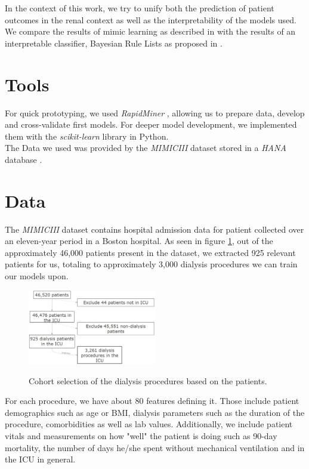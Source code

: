 \documentclass[conference,compsoc]{IEEEtran}
\begin{document}
In the context of this work, we try to unify both the prediction of patient outcomes in the renal context as well as the interpretability of the models used.
We compare the results of mimic learning as described in \cite{Che2016} with the results of an interpretable classifier, Bayesian Rule Lists as proposed in \cite{Letham2015}.


\section{Tools}
For quick prototyping, we used \emph{RapidMiner} \cite{RapidMiner}, allowing us to prepare data, develop and cross-validate first models. 
For deeper model development, we implemented them with the \emph{scikit-learn} library \cite{SKLearn} in Python. \\
The Data we used was provided by the \emph{MIMICIII} dataset \cite{Johnson2016} stored in a \emph{HANA} database \cite{Farber2012}.


\section{Data}
The \emph{MIMICIII} dataset contains hospital admission data for patient collected over an eleven-year period in a Boston hospital. 
As seen in figure \ref{fig:cohort}, out of the approximately 46,000 patients present in the dataset, we extracted 925 relevant patients for us, totaling to approximately 3,000 dialysis procedures we can train our models upon.

\begin{figure}[h]
	\includegraphics[width=0.5\textwidth]{cohort.jpg}
	\label{fig:cohort}
	\caption{Cohort selection of the dialysis procedures based on the patients.}
\end{figure}

For each procedure, we have about 80 features defining it. 
Those include patient demographics such as age or BMI, dialysis parameters such as the duration of the procedure, comorbidities as well as lab values. 
Additionally, we include patient vitals and measurements on how "well" the patient is doing such as 90-day mortality, the number of days he/she spent without mechanical ventilation and in the ICU in general.
\end{document}
